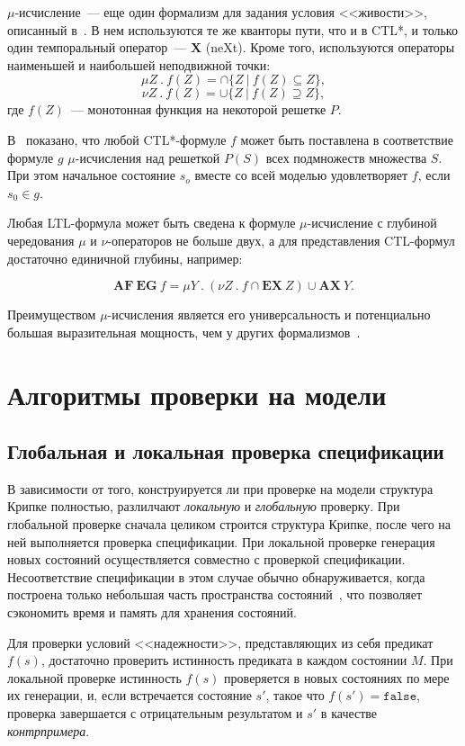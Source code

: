 \documentclass[a4paper,notitlepage,14pt]{article}
\begin{document}
$\mu$-исчисление~--- еще один формализм для задания условия <<живости>>, описанный
в~\cite{Clarke}. В нем используются те же кванторы пути, что и в CTL*, и только один
темпоральный оператор~--- $\mathbf{X}$ (neXt). Кроме того, используются операторы
наименьшей и наибольшей неподвижной точки:
$$ \mu Z~.~f(Z) = \cap \{Z~|~f(Z) \subseteq Z\}, $$
$$ \nu Z~.~f(Z) = \cup \{Z~|~f(Z) \supseteq Z\}, $$
где $f(Z)$~--- монотонная функция на некоторой решетке $P$.

В~\cite{Emerson97modelchecking} показано, что любой CTL*-формуле $f$ может быть поставлена
в соответствие формуле $g$ $\mu$-исчисления над решеткой $P(S)$ всех подмножеств множества
$S$. При этом начальное состояние $s_o$ вместе со всей моделью удовлетворяет $f$, если
$s_0 \in g$.

Любая LTL-формула может быть сведена к формуле $\mu$-исчисление с глубиной чередования
$\mu$ и $\nu$-операторов не больше двух, а для представления CTL-формул достаточно
единичной глубины, например:

$$\mathbf{AF~EG}~f = \mu Y~.~(\nu Z~.~f \cap \mathbf{EX}~Z) \cup \mathbf{AX}~Y.$$

Преимуществом $\mu$-исчисления является его универсальность и потенциально большая
выразительная мощность, чем у других формализмов~\cite{Emerson97modelchecking}.

\section{Алгоритмы проверки на модели}
\label{sec:modelchk-methods}

\subsection{Глобальная и локальная проверка спецификации}
\label{sec:global}

В зависимости от того, конструируется ли при проверке на модели структура Крипке
полностью, разлилчают \emph{локальную} и \emph{глобальную} проверку. При глобальной
проверке сначала целиком строится структура Крипке, после чего на ней выполняется проверка
спецификации. При локальной проверке генерация новых состояний осуществляется совместно с
проверкой спецификации. Несоответствие спецификации в этом случае обычно обнаруживается,
когда построена только небольшая часть пространства состояний~\cite{Clarke}, что позволяет
сэкономить время и память для хранения состояний.

Для проверки условий <<надежности>>, представляющих из себя предикат $f(s)$, достаточно
проверить истинность предиката в каждом состоянии $M$. При локальной проверке истинность
$f(s)$ проверяется в новых состояниях по мере их генерации, и, если встречается состояние
$s'$, такое что $f(s') = \mathtt{false}$, проверка завершается с отрицательным результатом
и $s'$ в качестве \emph{контрпримера}.
\end{document}
